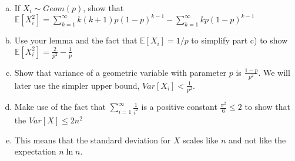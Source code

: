\documentclass[11pt]{article}
\newif\ifsolutions
\begin{document}
\begin{enumerate}
\begin{enumerate}[a)]
\item If $X_i \sim Geom(p)$, show that $\mathbb{E}[X_i^2] = \sum\nolimits_{k=1}^{\infty} k(k+1)p(1-p)^{k-1} - \sum\nolimits_{k=1}^{\infty} kp(1-p)^{k-1}$

\ifsolutions{\color{blue}{
By definition $\mathbb{E}[X_i^2] = \sum\nolimits_{k=1}^{\infty} k^2p(1-p)^{k-1}$. Since $k^2 = k(k+1) - k$, we can plug that in to get the answer. 
}}\fi


\item Use your lemma and the fact that $\mathbb{E}[X_i] = 1/p$ to simplify part c) to show $\mathbb{E}[X_i^2] = \frac{2}{p^2} - \frac{1}{p} $

\ifsolutions{\color{blue}{
We simply plug in our lemma to the first sum term in part c). We also notice that the second sum term is just the expectation of a geometric variable with parameter $p$. So, we get 
\[ \mathbb{E}[X_i^2] = p\cdot \frac{2}{p^3} - \frac{1}{p} \]
}}\fi


\item Show that variance of a geometric variable with parameter $p$ is
  $\frac{1-p}{p^2}$. We will later use the simpler upper bound, $Var[X_i] < \frac{1}{p^2}$.

\ifsolutions{\color{blue}{
\begin{align*}
Var[X_i] &= \mathbb{E}[X_i^2] - \mathbb{E}[X_i]^2 \\ 
&= \frac{2}{p^2} - \frac{1}{p}  - (\frac{1}{p})^2 \\
&= \frac{1}{p^2} - \frac{1}{p} \\
&= \frac{1-p}{p^2} < \frac{1}{p^2}
\end{align*}
}}\fi


\item Make use of the fact that $\sum\nolimits_{i=1}^{\infty}
  \frac{1}{i^2}$ is a positive constant $\frac{\pi^2}{6} \leq 2$ to show that the $Var[X] \leq 2n^2$ 

\ifsolutions{\color{blue}{
We use the fact that the $X_i$'s are independent, 
\begin{align*}
Var[X] &= \sum\nolimits_{i=1}^{n} Var[X_i] \\ 
&\leq \sum\nolimits_{i=1}^{n} \left(\frac{n}{n-i+1}\right)^2 \\
&= n^2\sum\nolimits_{j=1}^{n} \frac{1}{j^2} \\
&\leq n^2\sum\nolimits_{j=1}^{\infty} \frac{1}{j^2} \\
&\leq 2n^2
\end{align*}
}}\fi

\item This means that the standard deviation for $X$ scales like $n$
  and not like the expectation $n \ln n$. 


\end{enumerate}
\end{enumerate}
\end{document}
